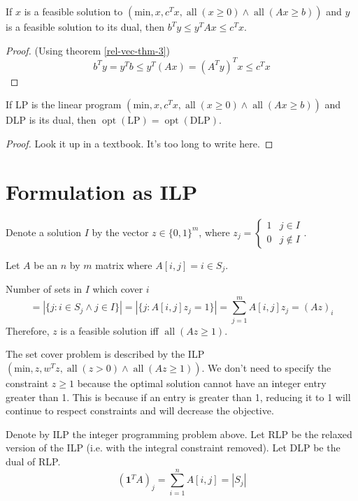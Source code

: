 \begin{theorem}
If $x$ is a feasible solution to
$(\textrm{min}, x, c^Tx, \operatorname{all}(x \ge 0) \wedge \operatorname{all}(Ax \ge b))$
and $y$ is a feasible solution to its dual, then $b^Ty \le y^TAx \le c^Tx$.
\end{theorem}
\begin{proof}
(Using theorem \ref{rel-vec-thm-3})
\[ b^Ty = y^Tb \le y^T(Ax) = (A^Ty)^Tx \le c^Tx \]
\end{proof}

\begin{theorem}
If LP is the linear program
$(\textrm{min}, x, c^Tx, \operatorname{all}(x \ge 0) \wedge \operatorname{all}(Ax \ge b))$
and DLP is its dual, then $\operatorname{opt}(\textrm{LP}) = \operatorname{opt}(\textrm{DLP})$.
\end{theorem}
\begin{proof} Look it up in a textbook. It's too long to write here. \end{proof}

\section{Formulation as ILP}

Denote a solution $I$ by the vector $z \in \{0, 1\}^m$, where
$z_j = \begin{cases} 1 & j \in I \\ 0 & j \not\in I \end{cases}$.

Let $A$ be an $n$ by $m$ matrix where $A[i, j] = i \in S_j$.

Number of sets in $I$ which cover $i$
\[ = |\{ j: i \in S_j \wedge j \in I \}| = |\{j: A[i, j]z_j = 1\}| = \sum_{j=1}^m A[i, j]z_j = (Az)_i \]
Therefore, $z$ is a feasible solution iff $\operatorname{all}(Az \ge 1)$.

The set cover problem is described by the ILP
$(\textrm{min}, z, w^Tz, \operatorname{all}(z > 0) \wedge \operatorname{all}(Az \ge 1))$.
We don't need to specify the constraint $z \ge 1$ because
the optimal solution cannot have an integer entry greater than 1.
This is because if an entry is greater than 1,
reducing it to 1 will continue to respect constraints and will decrease the objective.

Denote by ILP the integer programming problem above.
Let RLP be the relaxed version of the ILP (i.e. with the integral constraint removed).
Let DLP be the dual of RLP.
\[ (\mathbf{1}^T A)_j
= \sum_{i=1}^n A[i, j]
= |S_j| \]

